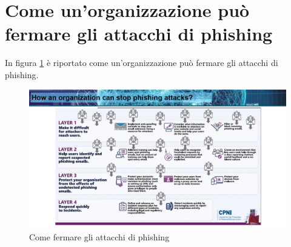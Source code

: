 \section{Come un'organizzazione può fermare gli attacchi di phishing}
In figura \ref{fig:my_label3} è riportato come un'organizzazione può fermare gli attacchi di phishing.
\begin{figure}
    \centering
    \includegraphics[width=1\textwidth]{images/5.png}
    \caption{Come fermare gli attacchi di phishing}
    \label{fig:my_label3}
\end{figure}